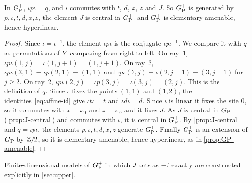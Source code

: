 \begin{lemma}\label{lem:GPp}
In $G_{\mathrm P}^{+}$, $\iota p\iota=q$, and $\iota$ commutes with $t$, $d$, $x$, $z$ and $J$. So $G_{\mathrm P}^{+}$ is generated by $p,\iota,t,d,x,z$, the element
$J$ is central in $G_{\mathrm P}^{+}$, and $G_{\mathrm P}^{+}$ is elementary amenable, hence hyperlinear.
\end{lemma}

\begin{proof}
Since $\iota=\iota^{-1}$, the element $\iota p\iota$ is the conjugate $\iota p\iota^{-1}$. We compare it with $q$ as permutations of $Y$,
composing from right to left. On ray~$1$, $\iota p\iota(1,j)=\iota(1,j+1)=(1,j+1)$. On ray~$3$, $\iota p\iota(3,1)=\iota p(2,1)=(1,1)$ and
$\iota p\iota(3,j)=\iota(2,j-1)=(3,j-1)$ for $j\ge2$. On ray~$2$, $\iota p\iota(2,j)=\iota p(3,j)=\iota(3,j)=(2,j)$. This is the
definition of $q$. Since $\iota$ fixes the points $(1,1)$ and $(1,2)$, the identities~\eqref{eq:affine-id} give $\iota t\iota=t$ and
$\iota d\iota=d$. Since $\iota$ is linear it fixes the site $0$, so it commutes with $x=x_0$ and $z=z_0$, and it fixes $J$. As $J$ is
central in $G_{\mathrm P}$ (\cref{prop:J-central}) and commutes with $\iota$, it is central in $G_{\mathrm P}^{+}$. By \cref{prop:J-central} and $q=\iota p\iota$,
the elements $p,\iota,t,d,x,z$ generate $G_{\mathrm P}^{+}$. Finally $G_{\mathrm P}^{+}$ is an extension of $G_{\mathrm P}$ by $\mathbb Z/2$, so it is elementary amenable, hence
hyperlinear, as in \cref{prop:GP-amenable}.
\end{proof}

Finite-dimensional models of $G_{\mathrm P}^{+}$ in which $J$ acts as $-I$ exactly are constructed explicitly in \cref{sec:upper}.
